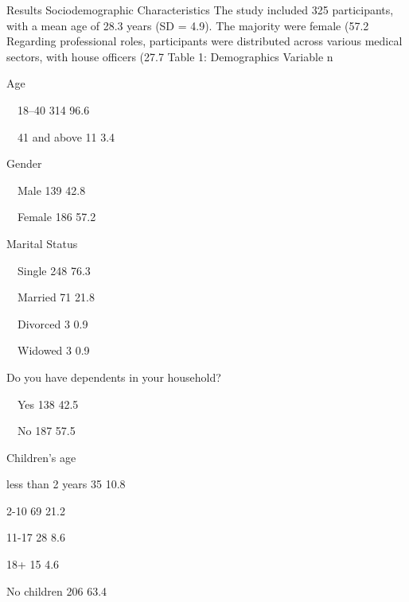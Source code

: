 Results
Sociodemographic Characteristics
The study included 325 participants, with a mean age of 28.3 years (SD = 4.9). The majority were female (57.2%
Regarding professional roles, participants were distributed across various medical sectors, with house officers (27.7%
Table 1: Demographics
Variable
n
%

Age



 18–40                                                
314
96.6%

 41 and above                                         
11
3.4%

Gender  



 Male                                                 
139
42.8%

 Female                                               
186
57.2%

Marital Status  



 Single       
248
76.3%

 Married   
71
21.8%

 Divorced     
3
0.9%

 Widowed 
3
0.9%

Do you have dependents in your household?  



 Yes                                                  
138
42.5%

 No                                                   
187
57.5%

Children’s age



   less than 2 years 
35    
10.8%

   2-10
69    
21.2%

   11-17 
28    
8.6%

   18+
15    
4.6%

   No children
206
63.4%

